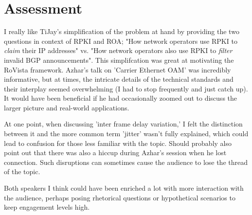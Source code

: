 \documentclass[twocolumn]{article}
\begin{document}
\section*{Assessment}
I really like TiJay's simplification of the problem at hand by providing the two questions in context of RPKI and ROA; "How network operators use RPKI to {\em claim} their IP addresses" vs. "How network operators also use RPKI to {\em filter} invalid BGP announcements". This simplifcation was great at motivating the RoVista framework. Azhar's talk on 'Carrier Ethernet OAM' was incredibly informative, but at times, the intricate details of the technical standards and their interplay seemed overwhelming (I had to stop frequently and just catch up). It would have been beneficial if he had occasionally zoomed out to discuss the larger picture and real-world applications.

At one point, when discussing 'inter frame delay variation,' I felt the distinction between it and the more common term 'jitter' wasn’t fully explained, which could lead to confusion for those less familiar with the topic. Should probably also point out that there was also a hiccup during Azhar's session when he lost connection. Such disruptions can sometimes cause the audience to lose the thread of the topic.

Both speakers I think could have been enriched a lot with more interaction with the audience, perhaps posing rhetorical questions or hypothetical scenarios to keep engagement levels high.
\end{document}
